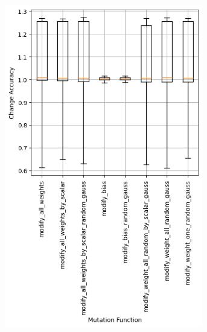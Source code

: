 \begin{figure}
    \begin{subfigure}{0.5\textwidth}
        \centering
        \includegraphics[width=0.95\textwidth]{plots/Mutatation_NotTrained_accuracy.png}
    \end{subfigure}
    \begin{subfigure}{0.5\textwidth}
        \centering

\end{subfigure}
\end{figure}
